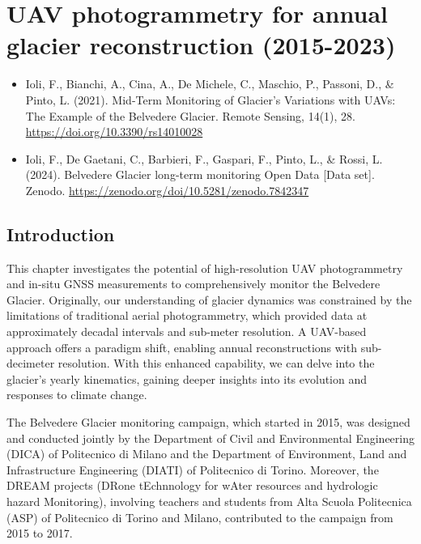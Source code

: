\graphicspath{{figures/chapter3/}}
\onehalfspacing

\chapter{UAV photogrammetry for annual glacier reconstruction (2015-2023)}\label{ch:3}

\vfill


\begin{itemize}
    \item \noindent Ioli, F., Bianchi, A., Cina, A., De Michele, C., Maschio, P., Passoni, D., \&
Pinto, L. (2021). Mid-Term Monitoring of Glacier's Variations with UAVs: The Example of the Belvedere Glacier. Remote Sensing, 14(1), 28. \url{https://doi.org/10.3390/rs14010028}
    \item Ioli, F., De Gaetani, C., Barbieri, F., Gaspari, F., Pinto, L., \& Rossi, L. (2024). Belvedere Glacier long-term monitoring Open Data [Data set]. Zenodo. \url{https://zenodo.org/doi/10.5281/zenodo.7842347}
\end{itemize}

\newpage

\section{Introduction}\label{sec:3:intro}

This chapter investigates the potential of high-resolution UAV photogrammetry and in-situ GNSS measurements to comprehensively monitor the Belvedere Glacier. 
Originally, our understanding of glacier dynamics was constrained by the limitations of traditional aerial photogrammetry, which provided data at approximately decadal intervals and sub-meter resolution. 
A UAV-based approach offers a paradigm shift, enabling annual reconstructions with sub-decimeter resolution.
With this enhanced capability, we can delve into the glacier's yearly kinematics, gaining deeper insights into its evolution and responses to climate change.

The Belvedere Glacier monitoring campaign, which started in 2015, was designed and conducted jointly by the Department of Civil and Environmental Engineering (DICA) of Politecnico di Milano and the Department of Environment, Land and Infrastructure Engineering (DIATI) of Politecnico di Torino. 
Moreover, the DREAM projects (DRone tEchnnology for wAter resources and hydrologic hazard Monitoring), involving teachers and students from Alta Scuola Politecnica (ASP) of Politecnico di Torino and Milano, contributed to the campaign from 2015 to 2017.

